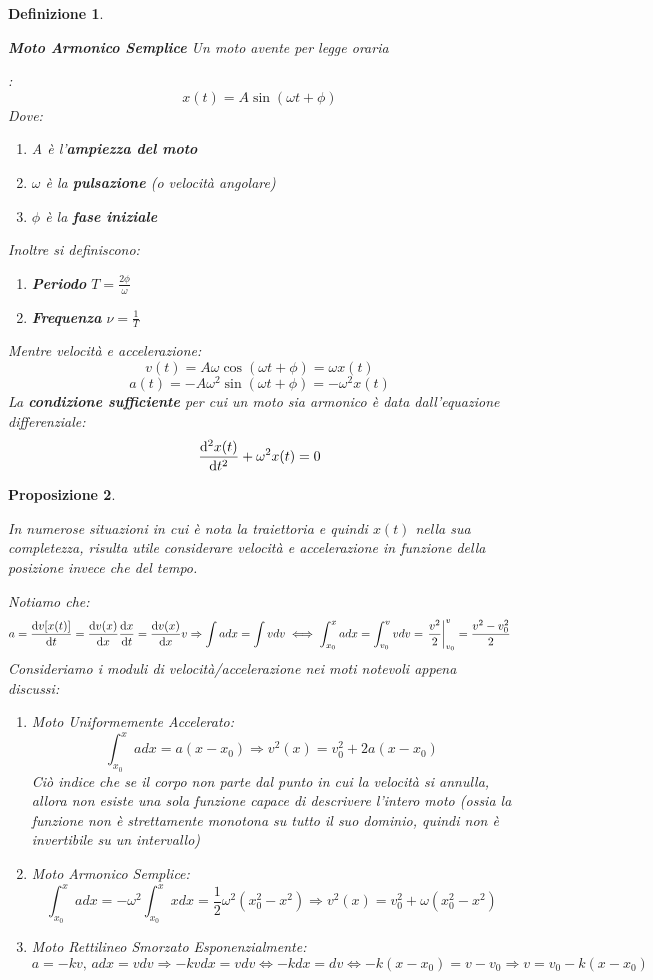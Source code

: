 \documentclass{article}
\newtheorem{defn}{Definizione}[section]
\newtheorem{prop}[defn]{Proposizione}
\newcommand{\then}{\ensuremath{\Rightarrow}}
\begin{document}
\begin{defn}
\hypertarget{armonicosemplice}{
\textbf{Moto Armonico Semplice} Un moto avente per legge oraria}:
\[x(t)=A\sin(\omega t+\phi)\]
Dove:
\begin{enumerate}
    \item A è l'\textbf{ampiezza del moto}
    \item $\omega$ è la \textbf{pulsazione} (o velocità angolare)
    \item $\phi$ è la \textbf{fase iniziale}
\end{enumerate}
Inoltre si definiscono:
\begin{enumerate}
    \item \textbf{Periodo} $T=\frac{2\phi}{\omega}$
    \item \textbf{Frequenza} $\nu=\frac{1}{T}$
\end{enumerate}
Mentre velocità e accelerazione:
\[v(t)=A\omega\cos(\omega t+\phi)=\omega x(t)\]
\[a(t)=-A\omega^2\sin(\omega t+\phi)=-\omega^2 x(t)\]
La \textbf{condizione sufficiente} per cui un moto sia armonico è data dall'equazione differenziale:
\[\dv[2]{x(t)}{t}+\omega^2x(t)=0\]
\end{defn}


\begin{prop}
\hypertarget{accelerazioneinascissa}{In numerose situazioni in cui è nota la traiettoria e quindi $x(t)$ nella sua completezza, risulta utile considerare velocità e accelerazione in funzione della posizione invece che del tempo.} Notiamo che:
\[a=\dv{v[x(t)]}{t}=\dv{v(x)}{x}\dv{x}{t}=\dv{v(x)}{x}v\then \int adx=\int vdv \iff \int_{x_0}^xadx=\int_{v_0}^v{vdv}=\eval{\frac{v^2}{2}}_{v_0}^v=\frac{v^2-v_0^2}{2}\]
Consideriamo i moduli di velocità/accelerazione nei moti notevoli appena discussi:
\begin{enumerate}
    \item Moto Uniformemente Accelerato:
    \[\int_{x_0}^xadx=a(x-x_0)\then v^2(x)=v_0^2+2a(x-x_0)\]
    Ciò indice che se il corpo non parte dal punto in cui la velocità si annulla, allora non esiste una sola funzione capace di descrivere l'intero moto (ossia la funzione non è strettamente monotona su tutto il suo dominio, quindi non è invertibile su un intervallo)
    \item Moto Armonico Semplice:
    \[\int_{x_0}^xadx=-\omega^2\int_{x_0}^xxdx=\frac{1}{2}\omega^2(x_0^2-x^2)\then v^2(x)=v_0^2+\omega(x_0^2-x^2)\]
    \item Moto Rettilineo Smorzato Esponenzialmente:
    \[a=-kv,\,adx=vdv\then -kvdx=vdv\iff -kdx=dv\iff -k(x-x_0)=v-v_0\then v=v_0-k(x-x_0) \]
\end{enumerate}
\end{prop}
\end{document}
